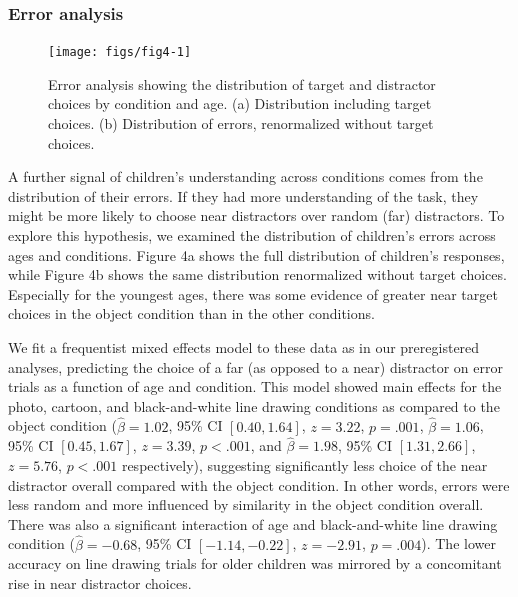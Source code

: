 \documentclass[10pt, letterpaper]{article}
\begin{document}
\subsubsection{Error analysis}\label{error-analysis}

\begin{CodeChunk}
\begin{figure}[tb]

{\centering \texttt{[image: figs/fig4-1]} 

}

\caption[Error analysis showing the distribution of target and distractor choices by condition and age]{Error analysis showing the distribution of target and distractor choices by condition and age. (a) Distribution including target choices. (b) Distribution of errors, renormalized without target choices.}\label{fig:fig4}
\end{figure}
\end{CodeChunk}

A further signal of children's understanding across conditions comes
from the distribution of their errors. If they had more understanding of
the task, they might be more likely to choose near distractors over
random (far) distractors. To explore this hypothesis, we examined the
distribution of children's errors across ages and conditions. Figure 4a
shows the full distribution of children's responses, while Figure 4b
shows the same distribution renormalized without target choices.
Especially for the youngest ages, there was some evidence of greater
near target choices in the object condition than in the other
conditions.

We fit a frequentist mixed effects model to these data as in our
preregistered analyses, predicting the choice of a far (as opposed to a
near) distractor on error trials as a function of age and condition.
This model showed main effects for the photo, cartoon, and
black-and-white line drawing conditions as compared to the object
condition (\(\hat{\beta} = 1.02\), 95\% CI \([0.40, 1.64]\),
\(z = 3.22\), \(p = .001\), \(\hat{\beta} = 1.06\), 95\% CI
\([0.45, 1.67]\), \(z = 3.39\), \(p < .001\), and
\(\hat{\beta} = 1.98\), 95\% CI \([1.31, 2.66]\), \(z = 5.76\),
\(p < .001\) respectively), suggesting significantly less choice of the
near distractor overall compared with the object condition. In other
words, errors were less random and more influenced by similarity in the
object condition overall. There was also a significant interaction of
age and black-and-white line drawing condition (\(\hat{\beta} = -0.68\),
95\% CI \([-1.14, -0.22]\), \(z = -2.91\), \(p = .004\)). The lower
accuracy on line drawing trials for older children was mirrored by a
concomitant rise in near distractor choices.
\end{document}
